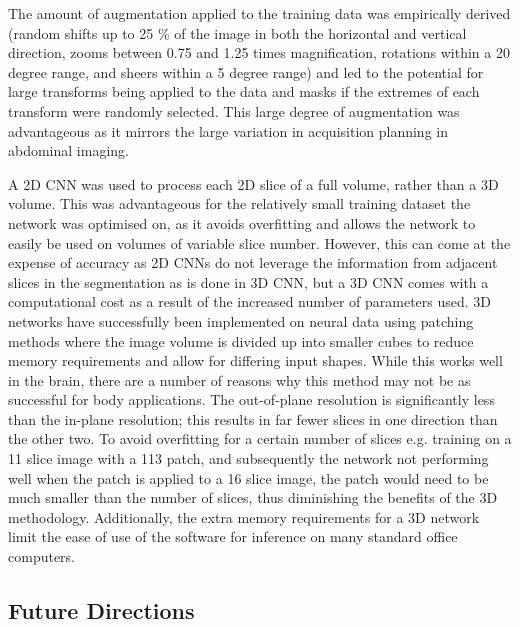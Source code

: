 The amount of augmentation applied to the training data was empirically derived (random shifts up to 25 \% of the image in both the horizontal and vertical direction, zooms between 0.75 and 1.25 times magnification, rotations within a 20 degree range, and sheers within a 5 degree range) and led to the potential for large transforms being applied to the data and masks if the extremes of each transform were randomly selected. This large degree of augmentation was advantageous as it mirrors the large variation in acquisition planning in abdominal imaging. 

A 2D \ac{CNN} was used to process each 2D slice of a full volume, rather than a 3D volume. This was advantageous for the relatively small training dataset the network was optimised on, as it avoids overfitting and allows the network to easily be used on volumes of variable slice number. However, this can come at the expense of accuracy as 2D \ac{CNN}s do not leverage the information from adjacent slices in the segmentation as is done in 3D \ac{CNN}, but a 3D \ac{CNN} comes with a computational cost as a result of the increased number of parameters used. 3D networks have successfully been implemented on neural data using patching methods where the image volume is divided up into smaller cubes \cite{wachinger_deepnat_2018} to reduce memory requirements and allow for differing input shapes. While this works well in the brain, there are a number of reasons why this method may not be as successful for body applications. The out-of-plane resolution is significantly less than the in-plane resolution; this results in far fewer slices in one direction than the other two. To avoid overfitting for a certain number of slices e.g. training on a 11 slice image with a 113 patch, and subsequently the network not performing well when the patch is applied to a 16 slice image, the patch would need to be much smaller than the number of slices, thus diminishing the benefits of the 3D methodology. Additionally, the extra memory requirements for a 3D network limit the ease of use of the software for inference on many standard office computers.

\subsection{Future Directions}

